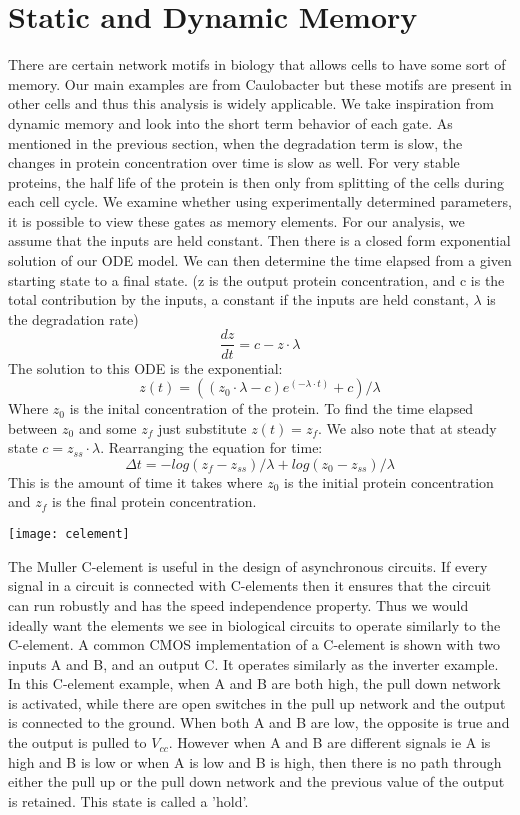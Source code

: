 \documentclass{article}
\begin{document}
\section{Static and Dynamic Memory}
There are certain network motifs in biology that allows cells to have some sort of memory.  Our main examples are from Caulobacter but these motifs are present in other cells and thus this analysis is widely applicable.  
We take inspiration from dynamic memory and look into the short term behavior of each gate.  As mentioned in the previous section, when the degradation term is slow, the changes in protein concentration over time is slow as well.  For very stable proteins, the half life of the protein is then only from splitting of the cells during each cell cycle.  We examine whether using experimentally determined parameters, it is possible to view these gates as memory elements.  For our analysis, we assume that the inputs are held constant.  Then there is a closed form exponential solution of our ODE model.  We can then determine the time elapsed from a given starting state to a final state.  (z is the output protein concentration, and c is the total contribution by the inputs, a constant if the inputs are held constant, $\lambda$ is the degradation rate)
\[\frac{dz}{dt}=c-z\cdot\lambda
\]
The solution to this ODE is the exponential:
\[z(t)=((z_0\cdot\lambda-c)e^{(-\lambda\cdot t)}+c)/\lambda
\]
Where $z_0$ is the inital concentration of the protein.  To find the time elapsed between $z_0$ and some $z_f$ just substitute $z(t)=z_f$.  We also note that at steady state $c=z_{ss}\cdot\lambda$.  Rearranging the equation for time:
\[\Delta t= -log(z_f-z_{ss})/ \lambda+ log(z_0-z_{ss})/ \lambda
\]
 This is the amount of time it takes where $z_0$ is the initial protein concentration and $z_f$ is the final protein concentration.
\newline
\begin{center}
\texttt{[image: celement]}
\end{center}
The Muller C-element is useful in the design of asynchronous circuits.  If every signal in a circuit is connected with C-elements then it ensures that the circuit can run robustly and has the speed independence property.  Thus we would ideally want the elements we see in biological circuits to operate similarly to the C-element.  A common CMOS implementation of a C-element is shown with two inputs A and B, and an output C.  It operates similarly as the inverter example.  In this C-element example, when A and B are both high, the pull down network is activated, while there are open switches in the pull up network and the output is connected to the ground.  When both A and B are low, the opposite is true and the output is pulled to $V_{cc}$.  However when A and B are different signals ie A is high and B is low or when A is low and B is high, then there is no path through either the pull up or the pull down network and the previous value of the output is retained.  This state is called a 'hold'.
\end{document}
